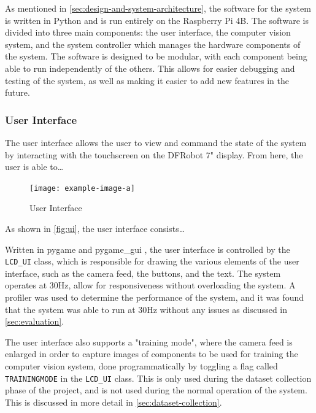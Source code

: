 As mentioned in \autoref{sec:design-and-system-architecture}, the software for the system is written in Python and is run entirely on the Raspberry Pi 4B. The software is divided into three main components: the user interface, the computer vision system, and the system controller which manages the hardware components of the system. The software is designed to be modular, with each component being able to run independently of the others. This allows for easier debugging and testing of the system, as well as making it easier to add new features in the future.

\subsubsection{User Interface}
The user interface allows the user to view and command the state of the system by interacting with the touchscreen on the DFRobot 7" display. From here, the user is able to\dots

\begin{figure}[H]
    \hfill
    \begin{minipage}[t]{\textwidth}
      \centering
      \texttt{[image: example-image-a]}
      \caption{User Interface}
      \label{fig:ui}
    \end{minipage}
\end{figure}

As shown in \autoref{fig:ui}, the user interface consists\dots

Written in pygame \cite{pygamedoc} and pygame\_gui \cite{pygamegui}, the user interface is controlled by the \texttt{LCD\_UI} class, which is responsible for drawing the various elements of the user interface, such as the camera feed, the buttons, and the text. The system operates at 30Hz, allow for responsiveness without overloading the system. A profiler was used to determine the performance of the system, and it was found that the system was able to run at 30Hz without any issues as discussed in \autoref{sec:evaluation}.

The user interface also supports a "training mode", where the camera feed is enlarged in order to capture images of components to be used for training the computer vision system, done programmatically by toggling a flag called \texttt{TRAININGMODE} in the \texttt{LCD\_UI} class. This is only used during the dataset collection phase of the project, and is not used during the normal operation of the system. This is discussed in more detail in \autoref{sec:dataset-collection}.


